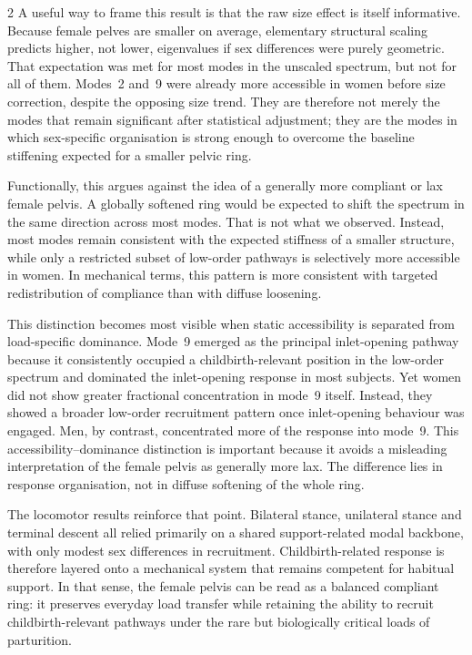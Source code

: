 \documentclass[openacc]{rsproca_new}
\begin{document}
\begin{multicols}{2}
A useful way to frame this result is that the raw size effect is itself informative. Because female pelves are smaller on average, elementary structural scaling predicts higher, not lower, eigenvalues if sex differences were purely geometric. That expectation was met for most modes in the unscaled spectrum, but not for all of them. Modes~2 and~9 were already more accessible in women before size correction, despite the opposing size trend. They are therefore not merely the modes that remain significant after statistical adjustment; they are the modes in which sex-specific organisation is strong enough to overcome the baseline stiffening expected for a smaller pelvic ring.

Functionally, this argues against the idea of a generally more compliant or lax female pelvis. A globally softened ring would be expected to shift the spectrum in the same direction across most modes. That is not what we observed. Instead, most modes remain consistent with the expected stiffness of a smaller structure, while only a restricted subset of low-order pathways is selectively more accessible in women. In mechanical terms, this pattern is more consistent with targeted redistribution of compliance than with diffuse loosening.

This distinction becomes most visible when static accessibility is separated from load-specific dominance. Mode~9 emerged as the principal inlet-opening pathway because it consistently occupied a childbirth-relevant position in the low-order spectrum and dominated the inlet-opening response in most subjects. Yet women did not show greater fractional concentration in mode~9 itself. Instead, they showed a broader low-order recruitment pattern once inlet-opening behaviour was engaged. Men, by contrast, concentrated more of the response into mode~9. This accessibility--dominance distinction is important because it avoids a misleading interpretation of the female pelvis as generally more lax. The difference lies in response organisation, not in diffuse softening of the whole ring.

The locomotor results reinforce that point. Bilateral stance, unilateral stance and terminal descent all relied primarily on a shared support-related modal backbone, with only modest sex differences in recruitment. Childbirth-related response is therefore layered onto a mechanical system that remains competent for habitual support. In that sense, the female pelvis can be read as a balanced compliant ring: it preserves everyday load transfer while retaining the ability to recruit childbirth-relevant pathways under the rare but biologically critical loads of parturition.


\end{multicols}
\end{document}
